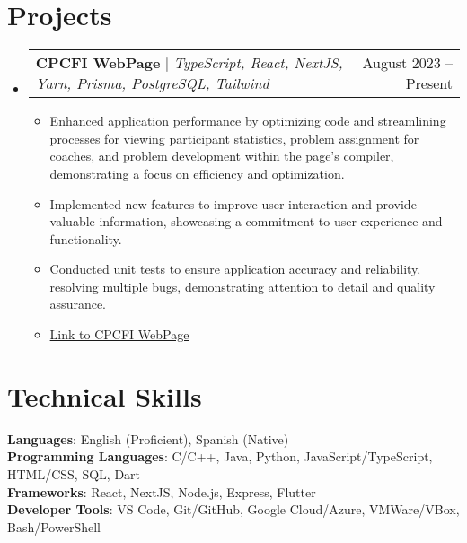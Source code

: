 \documentclass[letterpaper,11pt]{article}
\makeatletter
\newcommand{\resumeItem}[1]{
  \item\small{
    {#1 \vspace{-2pt}}
  }
}
\newcommand{\resumeProjectHeading}[2]{
    \item
    \begin{tabular*}{0.97\textwidth}{l@{\extracolsep{\fill}}r}
      \small#1 & #2 \\
    \end{tabular*}\vspace{-7pt}
}
\newcommand{\resumeSubHeadingListStart}{\begin{itemize}[leftmargin=0.15in, label={}]}
\newcommand{\resumeSubHeadingListEnd}{\end{itemize}}
\newcommand{\resumeItemListStart}{\begin{itemize}}
\newcommand{\resumeItemListEnd}{\end{itemize}\vspace{-5pt}}
\makeatother
\begin{document}
\section{Projects}
\resumeSubHeadingListStart
\resumeProjectHeading
{\textbf{CPCFI WebPage} $|$ \emph{TypeScript, React, NextJS, Yarn, Prisma, PostgreSQL, Tailwind}}{August 2023 -- Present}
\resumeItemListStart
\resumeItem{Enhanced application performance by optimizing code and streamlining processes for viewing participant statistics, problem assignment for coaches, and problem development within the page's compiler, demonstrating a focus on efficiency and optimization.}
\resumeItem{Implemented new features to improve user interaction and provide valuable information, showcasing a commitment to user experience and functionality.}
\resumeItem{Conducted unit tests to ensure application accuracy and reliability, resolving multiple bugs, demonstrating attention to detail and quality assurance.}
\resumeItem{\href{http://www.cpcfi.unam.mx:3000}{Link to CPCFI WebPage}}
\resumeItemListEnd
\resumeSubHeadingListEnd

\section{Technical Skills}
\begin{itemize}[leftmargin=0.15in, label={}]
  \small{\item{
        \textbf{Languages}{: English (Proficient), Spanish (Native)} \\
        \textbf{Programming Languages}{: C/C++, Java, Python, JavaScript/TypeScript, HTML/CSS, SQL, Dart} \\
        \textbf{Frameworks}{: React, NextJS, Node.js, Express, Flutter} \\
        \textbf{Developer Tools}{: VS Code, Git/GitHub, Google Cloud/Azure, VMWare/VBox, Bash/PowerShell}
        }}
\end{itemize}
\end{document}

